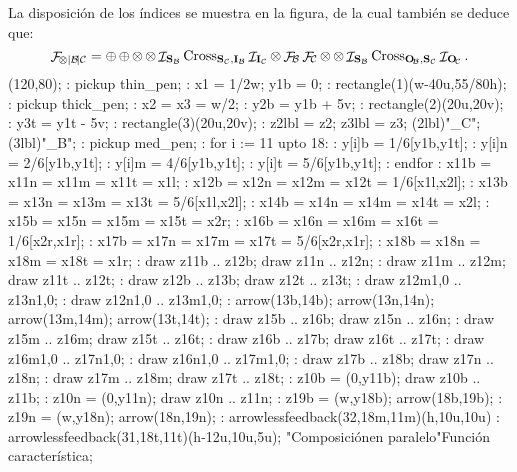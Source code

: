La disposición de los índices se muestra en la figura, de la cual
también se deduce que:
 $$ \F_{\prl\!|B\!|C} = \srl \srl
    \prl \prl \ID_{\st B} \op{Cross}_{\st C,\inp B} \ID_{\inp C}
    \prl \F_B \F_C
    \prl \prl \ID_{\st B} \op{Cross}_{\out B,\st C} \ID_{\out C} .$$
\vskip-6pt
\MTbeginfigure(120,80);
 \MT: pickup thin_pen;
 \MT: x1 = 1/2w; y1b = 0;
 \MT: rectangle(1)(w-40u,55/80h); %
 \MT: pickup thick_pen;
 \MT: x2 = x3 = w/2;
 \MT: y2b = y1b + 5v;
 \MT: rectangle(2)(20u,20v); %
 \MT: y3t = y1t - 5v;
 \MT: rectangle(3)(20u,20v); %
 \MT: z2lbl = z2; z3lbl = z3;
 \MTlabel(2lbl)"\F_C";
 \MTlabel(3lbl)"\F_B";
 \MT: pickup med_pen;
 \MT: for i := 11 upto 18:
 \MT:  y[i]b = 1/6[y1b,y1t];
 \MT:  y[i]n = 2/6[y1b,y1t];
 \MT:  y[i]m = 4/6[y1b,y1t];
 \MT:  y[i]t = 5/6[y1b,y1t];
 \MT: endfor
 \MT: x11b = x11n = x11m = x11t = x1l;
 \MT: x12b = x12n = x12m = x12t = 1/6[x1l,x2l];
 \MT: x13b = x13n = x13m = x13t = 5/6[x1l,x2l];
 \MT: x14b = x14n = x14m = x14t = x2l;
 \MT: x15b = x15n = x15m = x15t = x2r;
 \MT: x16b = x16n = x16m = x16t = 1/6[x2r,x1r];
 \MT: x17b = x17n = x17m = x17t = 5/6[x2r,x1r];
 \MT: x18b = x18n = x18m = x18t = x1r;
 \MT: draw z11b .. z12b; draw z11n .. z12n;
 \MT: draw z11m .. z12m; draw z11t .. z12t;
 \MT: draw z12b .. z13b; draw z12t .. z13t;
 \MT: draw z12m{1,0} .. z13n{1,0};
 \MT: draw z12n{1,0} .. z13m{1,0};
 \MT: arrow(13b,14b); arrow(13n,14n); arrow(13m,14m); arrow(13t,14t);
 \MT: draw z15b .. z16b; draw z15n .. z16n;
 \MT: draw z15m .. z16m; draw z15t .. z16t;
 \MT: draw z16b .. z17b; draw z16t .. z17t;
 \MT: draw z16m{1,0} .. z17n{1,0};
 \MT: draw z16n{1,0} .. z17m{1,0};
 \MT: draw z17b .. z18b; draw z17n .. z18n;
 \MT: draw z17m .. z18m; draw z17t .. z18t;
 \MT: z10b = (0,y11b); draw z10b .. z11b;
 \MT: z10n = (0,y11n); draw z10n .. z11n;
 \MT: z19b = (w,y18b); arrow(18b,19b);
 \MT: z19n = (w,y18n); arrow(18n,19n);
 \MT: arrowlessfeedback(32,18m,11m)(h,10u,10u)
 \MT: arrowlessfeedback(31,18t,11t)(h-12u,10u,5u);
\MTendfigure"Composición\cr en paralelo"Función característica;

